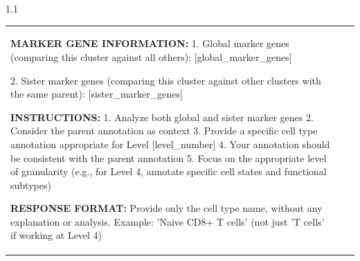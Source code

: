 \documentclass[11pt]{article}
\begin{document}
\begin{landscape}
\begin{spacing}{1.1}
\begin{longtable}{>{\raggedright\arraybackslash}p{2.5cm}>{\raggedright\arraybackslash}p{3cm}>{\raggedright\arraybackslash}p{15cm}}
\begin{tcolorbox}[colback=white,colframe=naturelightgray,boxrule=0.5pt,arc=0pt,left=5pt,right=5pt,top=5pt,bottom=5pt]
\textbf{MARKER GENE INFORMATION:}
1. Global marker genes (comparing this cluster against all others):
[global\_marker\_genes]

2. Sister marker genes (comparing this cluster against other clusters with the same parent):
[sister\_marker\_genes]

\textbf{INSTRUCTIONS:}
1. Analyze both global and sister marker genes
2. Consider the parent annotation as context
3. Provide a specific cell type annotation appropriate for Level [level\_number]
4. Your annotation should be consistent with the parent annotation
5. Focus on the appropriate level of granularity (e.g., for Level 4, annotate specific cell states and functional subtypes)

\textbf{RESPONSE FORMAT:}
Provide only the cell type name, without any explanation or analysis.
Example: 'Naive CD8+ T cells' (not just 'T cells' if working at Level 4)
\end{tcolorbox} \\

\end{longtable}
\end{spacing}
\end{landscape}

\clearpage
\end{document}
